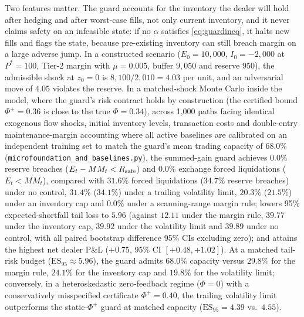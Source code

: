 Two features matter. The guard accounts for the inventory the dealer will hold after hedging and after worst-case fills, not only current inventory, and it never claims safety on an infeasible state: if no $\alpha$ satisfies \eqref{eq:guardineq}, it halts new fills and flags the state, because pre-existing inventory can still breach margin on a large adverse jump. In a constructed scenario ($E_0=10{,}000$, $I_0=-2{,}000$ at $P^*=100$, Tier-2 margin with $\mu=0.005$, buffer $9{,}050$ and reserve $950$), the admissible shock at $z_0=0$ is $8{,}100/2{,}010=4.03$ per unit, and an adversarial move of $4.05$ violates the reserve. In a matched-shock Monte Carlo inside the model, where the guard's risk contract holds by construction (the certified bound $\Phi^+=0.36$ is close to the true $\Phi=0.34$), across 1{,}000 paths facing identical exogenous flow shocks, initial inventory levels, transaction costs and double-entry maintenance-margin accounting where all active baselines are calibrated on an independent training set to match the guard's mean trading capacity of $68.0\%$ (\texttt{microfoundation\_and\_baselines.py}), the summed-gain guard achieves $0.0\%$ reserve breaches ($E_t-MM_t<R_{\rm safe}$) and $0.0\%$ exchange forced liquidations ($E_t<MM_t$), compared with $31.6\%$ forced liquidations ($34.7\%$ reserve breaches) under no control, $31.4\%$ ($34.1\%$) under a trailing volatility limit, $20.3\%$ ($21.5\%$) under an inventory cap and $0.0\%$ under a scanning-range margin rule; lowers 95\% expected-shortfall tail loss to $5.96$ (against $12.11$ under the margin rule, $39.77$ under the inventory cap, $39.92$ under the volatility limit and $39.89$ under no control, with all paired bootstrap difference 95\% CIs excluding zero); and attains the highest net dealer P\&L ($+0.75$, 95\% CI $[+0.48,+1.02]$). At a matched tail-risk budget ($\mathrm{ES}_{95}\approx 5.96$), the guard admits $68.0\%$ capacity versus $29.8\%$ for the margin rule, $24.1\%$ for the inventory cap and $19.8\%$ for the volatility limit; conversely, in a heteroskedastic zero-feedback regime ($\Phi=0$) with a conservatively misspecified certificate $\Phi^+=0.40$, the trailing volatility limit outperforms the static-$\Phi^+$ guard at matched capacity ($\mathrm{ES}_{95}=4.39$ vs.\ $4.55$).

